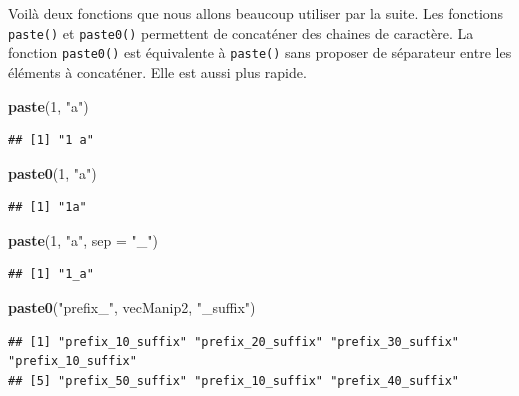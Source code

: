 \documentclass[
]{book}
\newenvironment{Shaded}{\begin{snugshade}}{\end{snugshade}}
\newcommand{\DataTypeTok}[1]{\textcolor[rgb]{0.13,0.29,0.53}{#1}}
\newcommand{\DecValTok}[1]{\textcolor[rgb]{0.00,0.00,0.81}{#1}}
\newcommand{\KeywordTok}[1]{\textcolor[rgb]{0.13,0.29,0.53}{\textbf{#1}}}
\newcommand{\NormalTok}[1]{#1}
\newcommand{\StringTok}[1]{\textcolor[rgb]{0.31,0.60,0.02}{#1}}
\begin{document}
Voilà deux fonctions que nous allons beaucoup utiliser par la suite. Les fonctions \texttt{paste()} et \texttt{paste0()} permettent de concaténer des chaines de caractère. La fonction \texttt{paste0()} est équivalente à \texttt{paste()} sans proposer de séparateur entre les éléments à concaténer. Elle est aussi plus rapide.

\begin{Shaded}
\begin{Highlighting}[]
\KeywordTok{paste}\NormalTok{(}\DecValTok{1}\NormalTok{, }\StringTok{"a"}\NormalTok{)}
\end{Highlighting}
\end{Shaded}

\begin{verbatim}
## [1] "1 a"
\end{verbatim}

\begin{Shaded}
\begin{Highlighting}[]
\KeywordTok{paste0}\NormalTok{(}\DecValTok{1}\NormalTok{, }\StringTok{"a"}\NormalTok{)}
\end{Highlighting}
\end{Shaded}

\begin{verbatim}
## [1] "1a"
\end{verbatim}

\begin{Shaded}
\begin{Highlighting}[]
\KeywordTok{paste}\NormalTok{(}\DecValTok{1}\NormalTok{, }\StringTok{"a"}\NormalTok{, }\DataTypeTok{sep =} \StringTok{"_"}\NormalTok{)}
\end{Highlighting}
\end{Shaded}

\begin{verbatim}
## [1] "1_a"
\end{verbatim}

\begin{Shaded}
\begin{Highlighting}[]
\KeywordTok{paste0}\NormalTok{(}\StringTok{"prefix_"}\NormalTok{, vecManip2, }\StringTok{"_suffix"}\NormalTok{)}
\end{Highlighting}
\end{Shaded}

\begin{verbatim}
## [1] "prefix_10_suffix" "prefix_20_suffix" "prefix_30_suffix" "prefix_10_suffix"
## [5] "prefix_50_suffix" "prefix_10_suffix" "prefix_40_suffix"
\end{verbatim}
\end{document}
